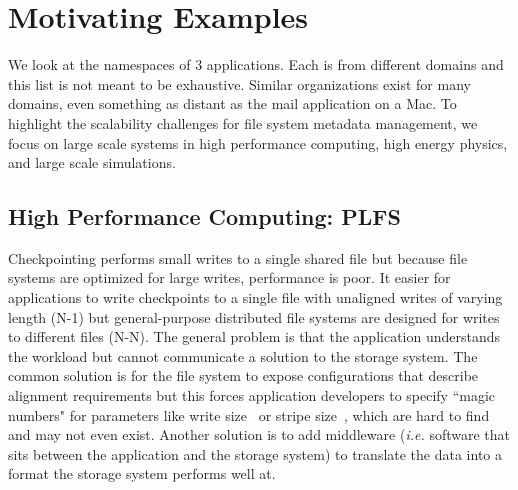 \section{Motivating Examples}
\label{sec:motivating-examples}

We look at the namespaces of 3 applications.  Each is from different domains
and this list is not meant to be exhaustive. Similar organizations exist for
many domains, even something as distant as the mail application on a Mac. To
highlight the scalability challenges for file system metadata management, we
focus on large scale systems in high performance computing, high energy
physics, and large scale simulations.


\subsection{High Performance Computing: PLFS}
\label{sec:plfs}

Checkpointing performs small writes to a single shared file but because file
systems are optimized for large writes, performance is poor.  It easier for
applications to write checkpoints to a single file with unaligned writes of
varying length (N-1) but general-purpose distributed file systems are designed
for writes to different files (N-N).  The general problem is that the
application understands the workload but cannot communicate a solution to the
storage system. The common solution is for the file system to expose
configurations that describe alignment requirements but this forces application
developers to specify ``magic numbers" for parameters like write size~\cite{bent_plfs_2009} or stripe size~\cite{behzad:sc2013-autotuning}, which are hard to find and may not even
exist.  Another solution is to add middleware ({\it i.e.} software that sits
between the application and the storage system) to translate the data into a
format the storage system performs well at. 


